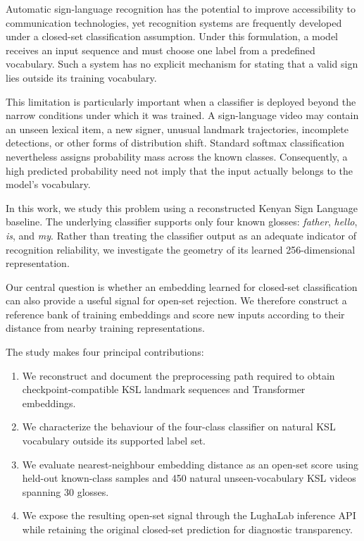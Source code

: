 \documentclass[11pt]{article}
\begin{document}
Automatic sign-language recognition has the potential to
improve accessibility to communication technologies, yet
recognition systems are frequently developed under a
closed-set classification assumption. Under this formulation,
a model receives an input sequence and must choose one label
from a predefined vocabulary. Such a system has no explicit
mechanism for stating that a valid sign lies outside its
training vocabulary.

This limitation is particularly important when a classifier
is deployed beyond the narrow conditions under which it was
trained. A sign-language video may contain an unseen lexical
item, a new signer, unusual landmark trajectories, incomplete
detections, or other forms of distribution shift. Standard
softmax classification nevertheless assigns probability mass
across the known classes. Consequently, a high predicted
probability need not imply that the input actually belongs
to the model's vocabulary.

In this work, we study this problem using a reconstructed
Kenyan Sign Language baseline. The underlying classifier
supports only four known glosses:
\emph{father}, \emph{hello}, \emph{is}, and \emph{my}.
Rather than treating the classifier output as an adequate
indicator of recognition reliability, we investigate the
geometry of its learned 256-dimensional representation.

Our central question is whether an embedding learned for
closed-set classification can also provide a useful signal
for open-set rejection. We therefore construct a reference
bank of training embeddings and score new inputs according
to their distance from nearby training representations.

The study makes four principal contributions:
\begin{enumerate}[leftmargin=*]
    \item We reconstruct and document the preprocessing path
    required to obtain checkpoint-compatible KSL landmark
    sequences and Transformer embeddings.

    \item We characterize the behaviour of the four-class
    classifier on natural KSL vocabulary outside its supported
    label set.

    \item We evaluate nearest-neighbour embedding distance as
    an open-set score using held-out known-class samples and
    450 natural unseen-vocabulary KSL videos spanning 30
    glosses.

    \item We expose the resulting open-set signal through the
    LughaLab inference API while retaining the original
    closed-set prediction for diagnostic transparency.
\end{enumerate}
\end{document}
